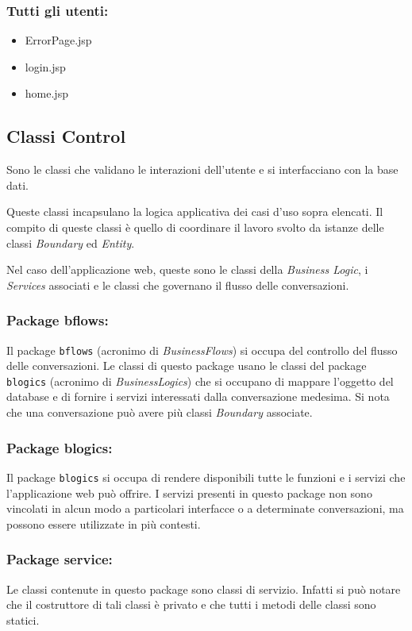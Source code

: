 	\subsubsection*{Tutti gli utenti:}
	
	\begin{itemize}
		\item ErrorPage.jsp
		\item login.jsp
		\item home.jsp	
	\end{itemize}
	
	\subsection{Classi Control}
	Sono le classi che validano le interazioni dell'utente e si interfacciano con la base dati.
	
	Queste classi incapsulano la logica applicativa dei casi d'uso sopra elencati. Il compito di queste classi è quello di coordinare il lavoro svolto da istanze delle classi \emph{Boundary} ed \emph{Entity}.
	
	Nel caso dell'applicazione web, queste sono le classi della \emph{Business Logic}, i \emph{Services} associati e le classi che governano il flusso delle conversazioni.
	
	\subsubsection*{Package bflows:}
	Il package \texttt{bflows} (acronimo di \emph{BusinessFlows}) si occupa del controllo del flusso delle conversazioni.
	Le classi di questo package usano le classi del package \texttt{blogics} (acronimo di \emph{BusinessLogics}) che si occupano di mappare l'oggetto del database e di fornire i servizi interessati dalla conversazione medesima.
	Si nota che una conversazione può avere più classi \emph{Boundary} associate.
	
	\subsubsection*{Package blogics:}
	Il package \texttt{blogics} si occupa di rendere disponibili tutte le funzioni e i servizi che l'applicazione web può offrire.
	I servizi presenti in questo package non sono vincolati in alcun modo a particolari interfacce o a determinate conversazioni, ma possono essere utilizzate in più contesti.
	
	\subsubsection*{Package service:}
	Le classi contenute in questo package sono classi di servizio. Infatti si può notare che il costruttore di tali classi è privato e che tutti i metodi delle classi sono statici.
	

